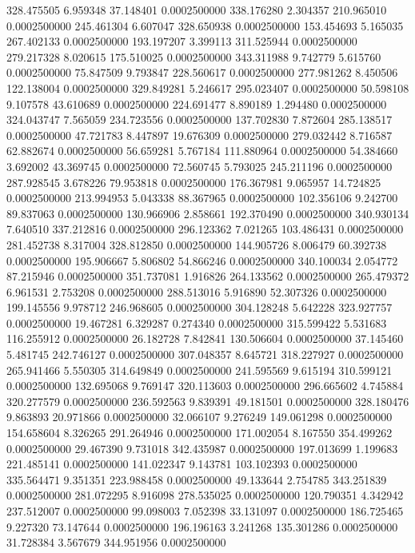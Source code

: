 328.475505 6.959348 37.148401 0.0002500000
338.176280 2.304357 210.965010 0.0002500000
245.461304 6.607047 328.650938 0.0002500000
153.454693 5.165035 267.402133 0.0002500000
193.197207 3.399113 311.525944 0.0002500000
279.217328 8.020615 175.510025 0.0002500000
343.311988 9.742779 5.615760 0.0002500000
75.847509 9.793847 228.560617 0.0002500000
277.981262 8.450506 122.138004 0.0002500000
329.849281 5.246617 295.023407 0.0002500000
50.598108 9.107578 43.610689 0.0002500000
224.691477 8.890189 1.294480 0.0002500000
324.043747 7.565059 234.723556 0.0002500000
137.702830 7.872604 285.138517 0.0002500000
47.721783 8.447897 19.676309 0.0002500000
279.032442 8.716587 62.882674 0.0002500000
56.659281 5.767184 111.880964 0.0002500000
54.384660 3.692002 43.369745 0.0002500000
72.560745 5.793025 245.211196 0.0002500000
287.928545 3.678226 79.953818 0.0002500000
176.367981 9.065957 14.724825 0.0002500000
213.994953 5.043338 88.367965 0.0002500000
102.356106 9.242700 89.837063 0.0002500000
130.966906 2.858661 192.370490 0.0002500000
340.930134 7.640510 337.212816 0.0002500000
296.123362 7.021265 103.486431 0.0002500000
281.452738 8.317004 328.812850 0.0002500000
144.905726 8.006479 60.392738 0.0002500000
195.906667 5.806802 54.866246 0.0002500000
340.100034 2.054772 87.215946 0.0002500000
351.737081 1.916826 264.133562 0.0002500000
265.479372 6.961531 2.753208 0.0002500000
288.513016 5.916890 52.307326 0.0002500000
199.145556 9.978712 246.968605 0.0002500000
304.128248 5.642228 323.927757 0.0002500000
19.467281 6.329287 0.274340 0.0002500000
315.599422 5.531683 116.255912 0.0002500000
26.182728 7.842841 130.506604 0.0002500000
37.145460 5.481745 242.746127 0.0002500000
307.048357 8.645721 318.227927 0.0002500000
265.941466 5.550305 314.649849 0.0002500000
241.595569 9.615194 310.599121 0.0002500000
132.695068 9.769147 320.113603 0.0002500000
296.665602 4.745884 320.277579 0.0002500000
236.592563 9.839391 49.181501 0.0002500000
328.180476 9.863893 20.971866 0.0002500000
32.066107 9.276249 149.061298 0.0002500000
154.658604 8.326265 291.264946 0.0002500000
171.002054 8.167550 354.499262 0.0002500000
29.467390 9.731018 342.435987 0.0002500000
197.013699 1.199683 221.485141 0.0002500000
141.022347 9.143781 103.102393 0.0002500000
335.564471 9.351351 223.988458 0.0002500000
49.133644 2.754785 343.251839 0.0002500000
281.072295 8.916098 278.535025 0.0002500000
120.790351 4.342942 237.512007 0.0002500000
99.098003 7.052398 33.131097 0.0002500000
186.725465 9.227320 73.147644 0.0002500000
196.196163 3.241268 135.301286 0.0002500000
31.728384 3.567679 344.951956 0.0002500000

